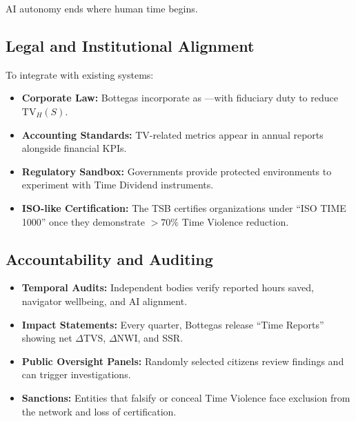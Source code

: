 AI autonomy ends where human time begins.

\subsection{Legal and Institutional Alignment}
\label{sec:legal-alignment}

To integrate with existing systems:

\begin{itemize}
    \item \textbf{Corporate Law:} Bottegas incorporate as —with fiduciary duty to reduce $\text{TV}_H(S)$.
    \item \textbf{Accounting Standards:} TV-related metrics appear in annual reports alongside financial KPIs.
    \item \textbf{Regulatory Sandbox:} Governments provide protected environments to experiment with Time Dividend instruments.
    \item \textbf{ISO-like Certification:} The TSB certifies organizations under ``ISO TIME 1000'' once they demonstrate $>70\%$ Time Violence reduction.
\end{itemize}

\subsection{Accountability and Auditing}
\label{sec:accountability}

\begin{itemize}
    \item \textbf{Temporal Audits:} Independent bodies verify reported hours saved, navigator wellbeing, and AI alignment.
    \item \textbf{Impact Statements:} Every quarter, Bottegas release ``Time Reports'' showing net $\Delta$TVS, $\Delta$NWI, and SSR.
    \item \textbf{Public Oversight Panels:} Randomly selected citizens review findings and can trigger investigations.
    \item \textbf{Sanctions:} Entities that falsify or conceal Time Violence face exclusion from the network and loss of certification.
\end{itemize}

